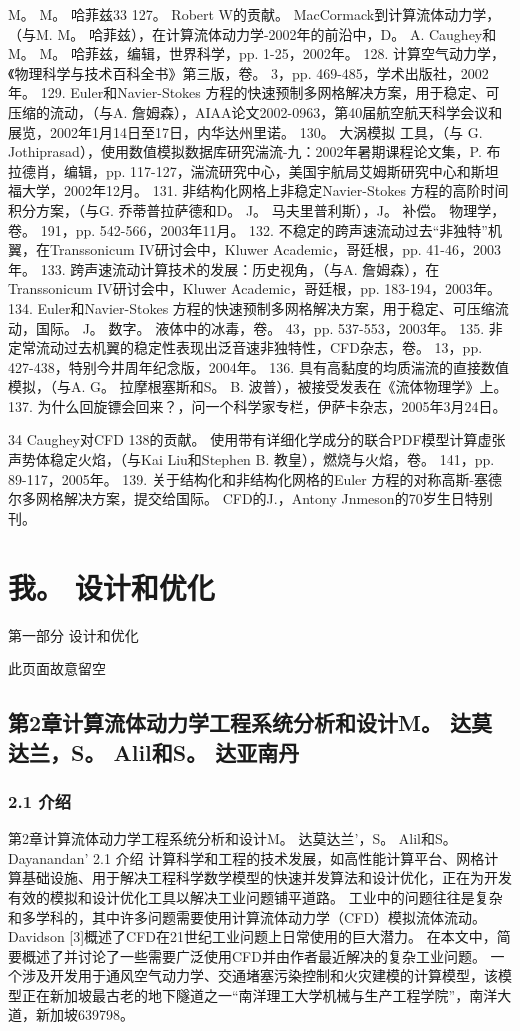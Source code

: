 \documentclass[UTF8,11pt,a4paper,openany,fontset=fandol]{ctexbook}
\begin{document}
M。 M。 哈菲兹33 127。 Robert W的贡献。 MacCormack到计算流体动力学，（与M. M。 哈菲兹），在计算流体动力学-2002年的前沿中，D。 A. Caughey和M。 M。 哈菲兹，编辑，世界科学，pp. 1-25，2002年。 128. 计算空气动力学，《物理科学与技术百科全书》第三版，卷。 3，pp. 469-485，学术出版社，2002年。 129. Euler和Navier-Stokes 方程的快速预制多网格解决方案，用于稳定、可压缩的流动，（与A. 詹姆森），AIAA论文2002-0963，第40届航空航天科学会议和展览，2002年1月14日至17日，内华达州里诺。 130。 大涡模拟 工具，（与 G. Jothiprasad），使用数值模拟数据库研究湍流-九：2002年暑期课程论文集，P. 布拉德肖，编辑，pp. 117-127，湍流研究中心，美国宇航局艾姆斯研究中心和斯坦福大学，2002年12月。 131. 非结构化网格上非稳定Navier-Stokes 方程的高阶时间积分方案，（与G. 乔蒂普拉萨德和D。 J。 马夫里普利斯），J。 补偿。 物理学，卷。 191，pp. 542-566，2003年11月。 132. 不稳定的跨声速流动过去“非独特”机翼，在Transsonicum IV研讨会中，Kluwer Academic，哥廷根，pp. 41-46，2003年。 133. 跨声速流动计算技术的发展：历史视角，（与A. 詹姆森），在Transsonicum IV研讨会中，Kluwer Academic，哥廷根，pp. 183-194，2003年。 134. Euler和Navier-Stokes 方程的快速预制多网格解决方案，用于稳定、可压缩流动，国际。 J。 数字。 液体中的冰毒，卷。 43，pp. 537-553，2003年。 135. 非定常流动过去机翼的稳定性表现出泛音速非独特性，CFD杂志，卷。 13，pp. 427-438，特别今井周年纪念版，2004年。 136. 具有高黏度的均质湍流的直接数值模拟，（与A. G。 拉摩根塞斯和S。 B. 波普），被接受发表在《流体物理学》上。 137. 为什么回旋镖会回来？，问一个科学家专栏，伊萨卡杂志，2005年3月24日。

34 Caughey对CFD 138的贡献。 使用带有详细化学成分的联合PDF模型计算虚张声势体稳定火焰，（与Kai Liu和Stephen B. 教皇），燃烧与火焰，卷。 141，pp. 89-117，2005年。 139. 关于结构化和非结构化网格的Euler 方程的对称高斯-塞德尔多网格解决方案，提交给国际。 CFD的J.，Antony Jnmeson的70岁生日特别刊。

\clearpage
\part{我。 设计和优化}
第一部分 设计和优化

此页面故意留空

\clearpage
\chapter{第2章计算流体动力学工程系统分析和设计M。 达莫达兰，S。 Alil和S。 达亚南丹}
\section{2.1 介绍}
第2章计算流体动力学工程系统分析和设计M。 达莫达兰'，S。 Alil和S。 Dayanandan' 2.1 介绍 计算科学和工程的技术发展，如高性能计算平台、网格计算基础设施、用于解决工程科学数学模型的快速并发算法和设计优化，正在为开发有效的模拟和设计优化工具以解决工业问题铺平道路。 工业中的问题往往是复杂和多学科的，其中许多问题需要使用计算流体动力学（CFD）模拟流体流动。 Davidson [3]概述了CFD在21世纪工业问题上日常使用的巨大潜力。 在本文中，简要概述了并讨论了一些需要广泛使用CFD并由作者最近解决的复杂工业问题。 一个涉及开发用于通风空气动力学、交通堵塞污染控制和火灾建模的计算模型，该模型正在新加坡最古老的地下隧道之一“南洋理工大学机械与生产工程学院”，南洋大道，新加坡639798。
\end{document}
